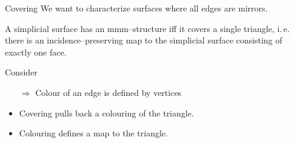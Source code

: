 \begin{frame}{Covering}
    \pause
    We want to characterize surfaces where all edges are mirrors.
    \pause
    \begin{lem}
        A simplicial surface has an mmm--structure iff it covers a 
        single triangle\pause, i.\,e. there is an incidence--preserving
        map to the simplicial surface consisting of exactly one face.
    \end{lem}
    \pause
    Consider
        \begin{center}
        \end{center}
    \begin{itemize}
        \pause
        \item[$\Rightarrow$] Colour of an edge is defined by vertices
        \pause
        \item Covering pulls back a colouring of the triangle.
        \pause
        \item Colouring defines a map to the triangle.
    \end{itemize}
\end{frame}


